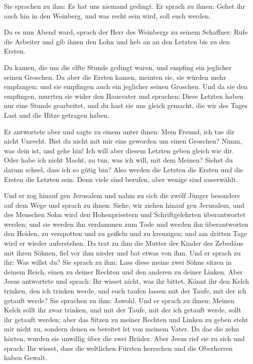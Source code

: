  Sie sprachen zu ihm: Es hat uns niemand gedingt. Er
sprach zu ihnen: Gehet ihr auch hin in den Weinberg, und was recht sein
wird, soll euch werden.

 Da es nun Abend ward, sprach der Herr des Weinbergs zu
seinem Schaffner: Rufe die Arbeiter und gib ihnen den Lohn und heb an an
den Letzten bis zu den Ersten.

 Da kamen, die um die elfte Stunde gedingt waren, und
empfing ein jeglicher seinen Groschen.  Da aber die
Ersten kamen, meinten sie, sie würden mehr empfangen; und sie empfingen
auch ein jeglicher seinen Groschen.  Und da sie den
empfingen, murrten sie wider den Hausvater  und sprachen:
Diese Letzten haben nur eine Stunde gearbeitet, und du hast sie uns
gleich gemacht, die wir des Tages Last und die Hitze getragen haben.

 Er antwortete aber und sagte zu einem unter ihnen: Mein
Freund, ich tue dir nicht Unrecht. Bist du nicht mit mir eins geworden
um einen Groschen?  Nimm, was dein ist, und gehe hin! Ich
will aber diesem Letzten geben gleich wie dir.  Oder habe
ich nicht Macht, zu tun, was ich will, mit dem Meinen? Siehst du darum
scheel, dass ich so gütig bin?  Also werden die Letzten
die Ersten und die Ersten die Letzten sein. Denn viele sind berufen,
aber wenige sind auserwählt.

 Und er zog hinauf gen Jerusalem und nahm zu sich die
zwölf Jünger besonders auf dem Wege und sprach zu ihnen: 
Siehe, wir ziehen hinauf gen Jerusalem, und des Menschen Sohn wird den
Hohenpriestern und Schriftgelehrten überantwortet werden; und sie werden
ihn verdammen zum Tode  und werden ihn überantworten den
Heiden, zu verspotten und zu geißeln und zu kreuzigen; und am dritten
Tage wird er wieder auferstehen.  Da trat zu ihm die
Mutter der Kinder des Zebedäus mit ihren Söhnen, fiel vor ihm nieder und
bat etwas von ihm.  Und er sprach zu ihr: Was willst du?
Sie sprach zu ihm: Lass diese meine zwei Söhne sitzen in deinem Reich,
einen zu deiner Rechten und den anderen zu deiner Linken.
 Aber Jesus antwortete und sprach: Ihr wisset nicht, was
ihr bittet. Könnt ihr den Kelch trinken, den ich trinken werde, und euch
taufen lassen mit der Taufe, mit der ich getauft werde? Sie sprachen zu
ihm: Jawohl.  Und er sprach zu ihnen: Meinen Kelch sollt
ihr zwar trinken, und mit der Taufe, mit der ich getauft werde, sollt
ihr getauft werden; aber das Sitzen zu meiner Rechten und Linken zu
geben steht mir nicht zu, sondern denen es bereitet ist von meinem
Vater.  Da das die zehn hörten, wurden sie unwillig über
die zwei Brüder.  Aber Jesus rief sie zu sich und sprach:
Ihr wisset, dass die weltlichen Fürsten herrschen und die Oberherren
haben Gewalt.

